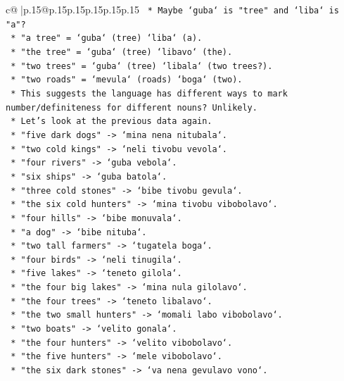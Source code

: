 \documentclass{article}
\begin{document}
{\begin{supertabular}{c@{$\;$}|p{.15\linewidth}@{}p{.15\linewidth}p{.15\linewidth}p{.15\linewidth}p{.15\linewidth}p{.15\linewidth}}
{{{\texttt{        *   Maybe `guba` is "tree" and `liba` is "a"?} \\
\texttt{        *   "a tree" = `guba` (tree) `liba` (a).} \\
\texttt{        *   "the tree" = `guba` (tree) `libavo` (the).} \\
\texttt{        *   "two trees" = `guba` (tree) `libala` (two trees?).} \\
\texttt{        *   "two roads" = `mevula` (roads) `boga` (two).} \\
\texttt{        *   This suggests the language has different ways to mark number/definiteness for different nouns? Unlikely.} \\
\texttt{        *   Let's look at the previous data again.} \\
\texttt{        *   "five dark dogs" {-}> `mina nena nitubala`.} \\
\texttt{        *   "two cold kings" {-}> `neli tivobu vevola`.} \\
\texttt{        *   "four rivers" {-}> `guba vebola`.} \\
\texttt{        *   "six ships" {-}> `guba batola`.} \\
\texttt{        *   "three cold stones" {-}> `bibe tivobu gevula`.} \\
\texttt{        *   "the six cold hunters" {-}> `mina tivobu vibobolavo`.} \\
\texttt{        *   "four hills" {-}> `bibe monuvala`.} \\
\texttt{        *   "a dog" {-}> `bibe nituba`.} \\
\texttt{        *   "two tall farmers" {-}> `tugatela boga`.} \\
\texttt{        *   "four birds" {-}> `neli tinugila`.} \\
\texttt{        *   "five lakes" {-}> `teneto gilola`.} \\
\texttt{        *   "the four big lakes" {-}> `mina nula gilolavo`.} \\
\texttt{        *   "the four trees" {-}> `teneto libalavo`.} \\
\texttt{        *   "the two small hunters" {-}> `momali labo vibobolavo`.} \\
\texttt{        *   "two boats" {-}> `velito gonala`.} \\
\texttt{        *   "the four hunters" {-}> `velito vibobolavo`.} \\
\texttt{        *   "the five hunters" {-}> `mele vibobolavo`.} \\
\texttt{        *   "the six dark stones" {-}> `va nena gevulavo vono`.} \\
}}}
\end{supertabular}}
\end{document}
